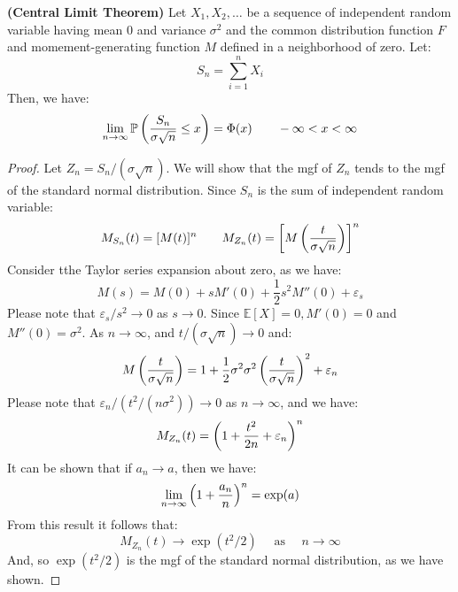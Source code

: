 \begin{theorem}{\textbf{(Central Limit Theorem)}}
    Let $X_1,X_2,\dots$ be a sequence of independent random variable having mean $0$ and variance $\sigma^2$ and the common distribution function $F$ and momement-generating function $M$ defined in a neighborhood of zero. Let:
    \begin{equation*}
        S_n = \sum^n_{i=1} X_i
    \end{equation*}
    Then, we have:
    \begin{equation*}
        \lim_{n\rightarrow\infty} \mathbb{P}\left( \frac{S_n}{\sigma\sqrt{n}} \le x \right) = \Phi(x) \qquad -\infty<x<\infty
    \end{equation*}
\end{theorem}
\begin{proof}
    Let $Z_n = S_n/(\sigma\sqrt{n})$. We will show that the mgf of $Z_n$ tends to the mgf of the standard normal distribution. Since $S_n$ is the sum of independent random variable:
    \begin{equation*}
        M_{S_n}(t) = [M(t)]^n \qquad M_{Z_n}(t) = \left[ M\left( \frac{t}{\sigma\sqrt{n}} \right) \right]^n
    \end{equation*}
    Consider tthe Taylor series expansion about zero, as we have:
    \begin{equation*}
        M(s) = M(0) + sM'(0) + \frac{1}{2}s^2M''(0) + \varepsilon_s
    \end{equation*}
    Please note that $\varepsilon_s/s^2\rightarrow0$ as $s\rightarrow0$. Since $\mathbb{E}[X] = 0, M'(0) = 0$ and $M''(0) = \sigma^2$. As $n\rightarrow\infty$, and $t/(\sigma\sqrt{n})\rightarrow0$ and:
    \begin{equation*}
        M\left( \frac{t}{\sigma\sqrt{n}} \right) = 1 + \frac{1}{2}\sigma^2\sigma^2\left( \frac{t}{\sigma\sqrt{n}} \right)^2 + \varepsilon_n
    \end{equation*}
    Please note that $\varepsilon_n/(t^2/(n\sigma^2))\rightarrow0$ as $n\rightarrow\infty$, and we have:
    \begin{equation*}
        M_{Z_n}(t) = \left( 1 + \frac{t^2}{2n} + \varepsilon_n \right)^n
    \end{equation*}
    It can be shown that if $a_n\rightarrow a$, then we have:
    \begin{equation*}
        \lim_{n\rightarrow \infty}\left( 1 + \frac{a_n}{n} \right)^n=\exp(a)
    \end{equation*}
    From this result it follows that:
    \begin{equation*}
        M_{Z_n}(t)\rightarrow\exp(t^2/2) \quad \text{ as } \quad n\rightarrow\infty
    \end{equation*}
    And, so $\exp(t^2/2)$ is the mgf of the standard normal distribution, as we have shown.
\end{proof}


